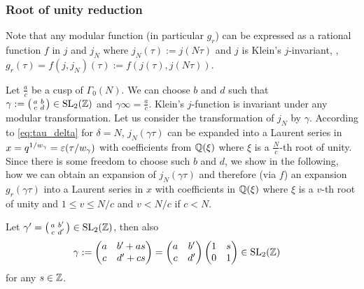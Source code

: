 \documentclass{article}
\begin{document}
\subsubsection{Root of unity reduction}

Note that any modular function (in particular $g_r$) can be expressed
as a rational function $f$ in $j$ and $j_N$ where
$j_N(\tau):=j(N\tau)$ and $j$ is Klein's $j$-invariant, \ie,
$g_r(\tau)=f(j, j_N)(\tau) := f(j(\tau), j(N\tau))$.

Let $\frac{a}{c}$ be a cusp of $\Gamma_0(N)$.
%
We can choose $b$ and $d$ such that
%
$\gamma := \bigl(
\begin{smallmatrix}
  a & b\\
  c & d
\end{smallmatrix}
\bigr) \in \SL2Z$ and $\gamma\infty=\frac{a}{c}$.
%
Klein's $j$-function is invariant under any modular transformation.
%
Let us consider the transformation of $j_N$ by $\gamma$.
%
According to \eqref{eq:tau_delta} for $\delta=N$, $j_N(\gamma\tau)$
can be expanded into a Laurent series in
$x=q^{1/w_\gamma}=\varepsilon\!\left(\tau/w_\gamma\right)$ with
coefficients from $\mathbb{Q}(\xi)$ where $\xi$ is a $\frac{N}{c}$-th root
of unity.
%
Since there is some freedom to choose such $b$ and $d$, we show in the
following, how we can obtain an expansion of $j_N(\gamma\tau)$ and
therefore (via $f$) an expansion $g_r(\gamma\tau)$ into a Laurent
series in $x$ with coefficients in $\mathbb{Q}(\xi)$ where $\xi$ is a
$v$-th root of unity and $1 \leq v \le N/c$ and $v<N/c$ if $c<N$.

Let
$\gamma' = \bigl(
\begin{smallmatrix}
  a & b'\\
  c & d'
\end{smallmatrix}
\bigr) \in \SL2Z$, then also
\begin{align*}
  \gamma
  &:=
    \begin{pmatrix}
      a & b' + as\\
      c & d' + cs
    \end{pmatrix}
  =
    \begin{pmatrix}
      a & b'\\
      c & d'
    \end{pmatrix}
    \begin{pmatrix}
      1 & s\\
      0 & 1
    \end{pmatrix}
    \in \SL2Z
\end{align*}
for any $s\in\mathbb{Z}$.
\end{document}
